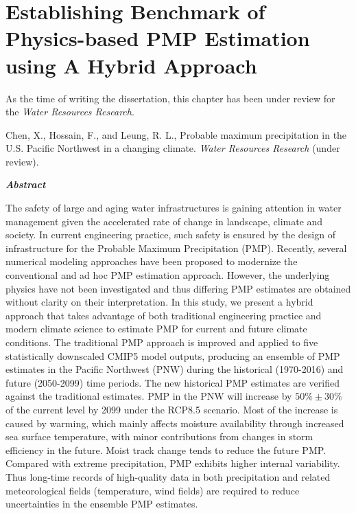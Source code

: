 \chapter {Establishing Benchmark of Physics-based PMP Estimation using A Hybrid Approach}
\label{ch:WRR}



As the time of writing the dissertation, this chapter has been under review for the \textit{Water Resources Research}.\\

\bigbreak

\noindent
{}
\setlength{\hangindent}{2em}
Chen, X., Hossain, F., and Leung, R. L., Probable maximum precipitation in the U.S. Pacific Northwest in a changing climate. \textit{Water Resources Research} (under review).

\vspace{10mm}

\noindent
\textit{\textbf{Abstract}}
 
The safety of large and aging water infrastructures is gaining attention in water management given the accelerated rate of change in landscape, climate and society. In current engineering practice, such safety is ensured by the design of infrastructure for the Probable Maximum Precipitation (PMP). Recently, several numerical modeling approaches have been proposed to modernize the conventional and ad hoc PMP estimation approach. However, the underlying physics have not been investigated and thus differing PMP estimates are obtained without clarity on their interpretation. In this study, we present a hybrid approach that takes advantage of both traditional engineering practice and modern climate science to estimate PMP for current and future climate conditions. The traditional PMP approach is improved and applied to five statistically downscaled CMIP5 model outputs, producing an ensemble of PMP estimates in the Pacific Northwest (PNW) during the historical (1970-2016) and future (2050-2099) time periods. The new historical PMP estimates are verified against the traditional estimates. PMP in the PNW will increase by $50\%\pm30\%$ of the current level by 2099 under the RCP8.5 scenario. Most of the increase is caused by warming, which mainly affects moisture availability through increased sea surface temperature, with minor contributions from changes in storm efficiency in the future. Moist track change tends to reduce the future PMP. Compared with extreme precipitation, PMP exhibits higher internal variability. Thus long-time records of high-quality data in both precipitation and related meteorological fields (temperature, wind fields) are required to reduce uncertainties in the ensemble PMP estimates.

